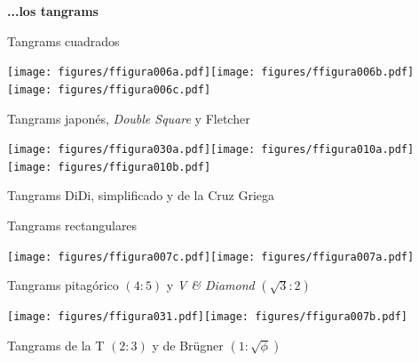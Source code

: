 \documentclass[14pt,aspectratio=169,usenames,dvipsnames]{beamer}
\begin{document}

    \begin{frame}{}
        \begin{center}
            \textbf{\huge ...los tangrams}
        \end{center}
    \end{frame}


    \begin{frame}{Tangrams cuadrados}
        \begin{center}
            \texttt{[image: figures/ffigura006a.pdf]}\qquad\texttt{[image: figures/ffigura006b.pdf]}\qquad\texttt{[image: figures/ffigura006c.pdf]}\\

            \bigskip

            Tangrams japonés, \emph{Double Square} y Fletcher

            \bigskip

            \texttt{[image: figures/ffigura030a.pdf]}\qquad\texttt{[image: figures/ffigura010a.pdf]}\qquad\texttt{[image: figures/ffigura010b.pdf]}\\

            \bigskip

             Tangrams DiDi, simplificado y de la Cruz Griega
        \end{center}
    \end{frame}


    \begin{frame}{Tangrams rectangulares}
        \begin{center}
            \texttt{[image: figures/ffigura007c.pdf]}\qquad\quad\texttt{[image: figures/ffigura007a.pdf]}\;\;\phantom{.} \\

            \bigskip

            Tangrams pitagórico $(4\!\!:\!\!5)$ y \emph{V \& Diamond} $(\sqrt{3}\!\!:\!\!2)$\\

            \bigskip

            \texttt{[image: figures/ffigura031.pdf]}\qquad\texttt{[image: figures/ffigura007b.pdf]}\;\;\phantom{.}\\

            \bigskip

            Tangrams de la T $(2\!\!:\!\!3)$ y de Brügner $(1\!\!:\!\!\sqrt{\phi})$\\
        \end{center}
    \end{frame}
\end{document}
